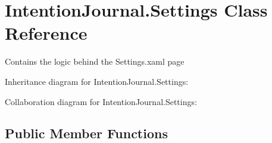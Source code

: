 \hypertarget{class_intention_journal_1_1_settings}{}\section{Intention\+Journal.\+Settings Class Reference}
\label{class_intention_journal_1_1_settings}


Contains the logic behind the Settings.\+xaml page  




Inheritance diagram for Intention\+Journal.\+Settings\+:


Collaboration diagram for Intention\+Journal.\+Settings\+:
\subsection*{Public Member Functions}
